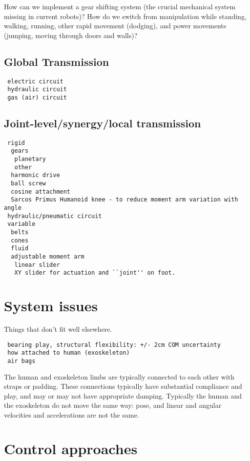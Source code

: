 \documentclass[letterpaper,12pt,fullpage]{article}
\begin{document}
How can we implement a gear shifting system (the crucial mechanical
system missing in current robots)? How do we switch from manipulation
while standing, walking, running, other rapid movement (dodging), and
power movements (jumping, moving through doors and walls)?

\subsection{Global Transmission}

\begin{verbatim}
 electric circuit
 hydraulic circuit
 gas (air) circuit
\end{verbatim}

\subsection{Joint-level/synergy/local transmission}

\begin{verbatim}
 rigid
  gears
   planetary
   other
  harmonic drive
  ball screw
  cosine attachment
  Sarcos Primus Humanoid knee - to reduce moment arm variation with angle
 hydraulic/pneumatic circuit
 variable
  belts
  cones
  fluid
  adjustable moment arm
   linear slider
   XY slider for actuation and ``joint'' on foot.
\end{verbatim}

\section{System issues}

Things that don't fit well elsewhere.

\begin{verbatim}
 bearing play, structural flexibility: +/- 2cm COM uncertainty
 how attached to human (exoskeleton)
 air bags
\end{verbatim}

The human and exoskeleton limbs are typically connected to each
other with straps or padding. These connections typically have substantial
compliance and play, and may or may not have appropriate damping.
Typically the human and the exoskeleton do not move the same way:
pose, and linear and angular velocities and accelerations are not the same.

\section{Control approaches}
\end{document}
